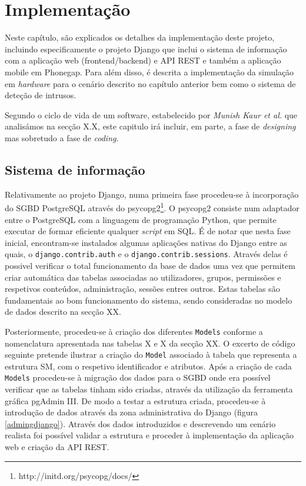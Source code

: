 



\chapter{Implementação}
\label{implementacao}





Neste capítulo, são explicados os detalhes da implementação deste projeto, incluindo especificamente o projeto Django que inclui o sistema de informação com a aplicação web (frontend/backend) e API REST e também a aplicação mobile em Phonegap. Para além disso, é descrita a implementação da simulação em \textit{hardware} para o cenário descrito no capítulo anterior bem como o sistema de deteção de intrusos. 

Segundo o ciclo de vida de um software, estabelecido por \textit{Munish Kaur et al.}\cite{Saini2014} que analisámos na secção X.X, este capitulo irá incluir, em parte, a fase de \textit{designing} mas sobretudo a fase de \textit{coding}. 





\section{Sistema de informação}


Relativamente ao projeto Django, numa primeira fase procedeu-se à incorporação do \ac{SGBD} PostgreSQL através do psycopg2\footnote{http://initd.org/psycopg/docs/}. O psycopg2 consiste num adaptador entre o PostgreSQL com a linguagem de programação Python, que permite executar de formar eficiente qualquer \textit{script} em \ac{SQL}. É de notar que nesta fase inicial, encontram-se instalados algumas aplicações nativas do Django entre as quais, o  \texttt{django.contrib.auth} e  o \texttt{django.contrib.sessions}. Através delas é possivel verificar o total funcionamento da base de dados uma vez que permitem criar automática das tabelas associadas ao utilizadores, grupos, permissões e respetivos conteúdos, administração, sessões entres outros. Estas tabelas são fundamentais ao bom funcionamento do sistema, sendo consideradas no modelo de dados descrito na secção XX. 


Posteriormente, procedeu-se à criação dos diferentes \texttt{Models} conforme a nomenclatura apresentada nas tabelas X e X da secção XX. O excerto de código seguinte pretende ilustrar a criação do \texttt{Model} associado à tabela que representa a estrutura \acl{SM}, com o respetivo identificador e atributos.  Após a criação de cada \texttt{Models} procedeu-se à migração dos dados para o \ac{SGBD} onde era possível verificar que as tabelas tinham sido criadas, através da utilização da ferramenta gráfica pgAdmin III. De modo a testar a estrutura criada, procedeu-se à introdução de dados através da zona administrativa do Django (figura \ref{admingdjango}). Através dos dados introduzidos e descrevendo um cenário realista foi possível validar a estrutura e proceder à implementação da aplicação web e criação da \ac{API} \ac{REST}. 




